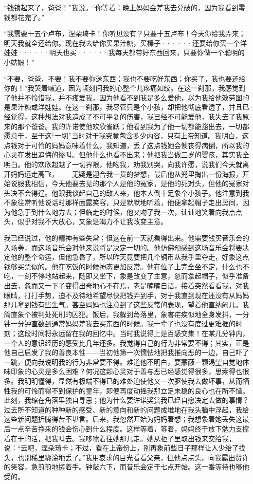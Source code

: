 \documentclass[12pt, UTF8]{ctexbook}
\begin{document}
\par “钱锁起来了，爸爸！”我说。“你等着：晚上妈妈会差我去兑破的，因为我看到零钱都花完了。”
\par “我需要十五个卢布，涅朵琦卡！你听见没有？只要十五卢布！今天你给我弄来；明天我就全还给你。现在我去给你买果汁糖，买榛子······还要给你买一个洋娃娃······明天也买······我每天都带好东西回来，只要你做一个聪明的小姑娘！”
\par “不要，爸爸，不要！我不要你送东西；我也不要吃好东西；你买了，我也要还给你的！”我哭着喊道，因为顷刻间我的心整个儿疼痛如绞。在这一刹那，我感觉到了他并不怜惜我，并不疼爱我，因为他看不到我是多么爱他，以为我给他效劳图的是果汁糖或洋娃娃。在这一刹那，我尽管只是个小孩，却把他彻底看透了，并且已经觉得，这种想法对我造成了不可平复的伤害，我已经不可能爱他，我失去了我原来的那个爸爸。我的许诺使他欢欣雀跃；他看到我为了他一切都能豁出去，一切都愿意干，至于这“一切”当时对于我究竟包含多少内容，只有上帝知道。我明白，这点钱对于可怜的妈妈意味着什么，我知道，丢了这点钱她会懊丧得病倒，所以我的心灵在发出追悔的惨叫。但他什么也看不出来；他把我当做三岁的婴孩，其实我全明白。他的欢欣超越了一切界限，他吻我，劝我别哭，向我许愿，说我们今天就离开妈妈远走高飞，——无疑是迎合我一贯的梦想，最后他从兜里掏出一份海报，开始说服我相信，今天他要去见的那个人是他的冤家，是他的死对头，但他的冤家对头决不会得逞。他跟我谈起自己的敌人来，他本人倒十足象个小孩子。他注意到我不象往常听他说话时那样面露笑容，只是默默地听着，他便拿起帽子走出房间，因为他急于到什么地方去；但临走的时候，他又吻了我一次，讪讪地笑着向我点点头，似乎对我不大放心，又象是竭力不让我改变主意。
\par 我已经说过，他的精神有些失常；但这在前一天就看得出来。他需要钱买音乐会的入场券，而这场音乐会对他来说将是决定一切的。他仿佛预感到这场音乐会将要决定他的整个命运，但他急昏了，所以昨天竟要把几个铜币从我手里夺走，好象这点钱够买票似的。他在吃饭的时候神态更加反常。他在位子上完全坐不定，什么也不吃，一刻不停地站起来，随即又坐下，象是改变了主意，忽而拿起帽子，似乎准备出去，忽而又一下子变得出奇地心不在焉，老是喃喃自语，接着突然看看我，对我眼睛，打打手势，迫不及待地希望尽快把钱弄到手，对于我直到现在还没有从妈妈那儿拿到钱有些生气。甚至妈妈也注意到了这些反常的表现，望着他直纳闷儿。我简直象个被判处死刑的囚犯。饭后，我躲到角落里，象害疟疾似地全身发抖，一分钟一分钟直数到通常妈妈差我去买东西的时候。我一辈子也没有度过更难捱的时刻；这段时间将永远留在我的回忆中。当时我说得上是百感交集！在某几分钟内，一个人的意识经历的感受比几年还多。我觉得自己的行为非常要不得；其实，正是他自己启发了我的善良本性——当初他第一次懦怯地把我推向恶的一边，自己吓了一跳，便向我说明我的行为非常要不得。难道他不明白，要蒙蔽一颗渴望自觉地体味印象的心灵是多么困难？何况这颗心灵对于善与恶已经感觉得很多，思索得也很多。我明明懂得，显然有极端不得已的难处迫使他又一次驱使我去做坏事，从而牺牲我的可怜而得不到保护的童年，即便再度动摇我那立足未稳的良心也在所不惜。此刻，我缩在角落里独自寻思；他为什么要许诺奖赏我已经自愿决定去做的事情？过去所不知道的种种新的感受、新的意向和新的问题成堆地在我头脑中浮起，我给这些新问题折腾得苦不堪言。后来，我忽然开始为妈妈着想；我想象着她丢失这最后一点辛苦挣来的钱会伤心到什么程度。这样等着，等着，妈妈终于放下勉力支撑着在干的活，把我叫去。我哆嗦着往她那儿走。她从柜子里取出钱来交给我，说：“去吧，涅朵琦卡；不过，看在上帝份上，别再象前些日子那样让人少绐了找头，也别稀里糊涂地丢了。”我用哀求的目光看看父亲，但他点点头，向我露出赞许的笑容，急煎煎地搓着手。钟敲六下，而音乐会定于七点开始。这一番等待也够他受的。
\end{document}
